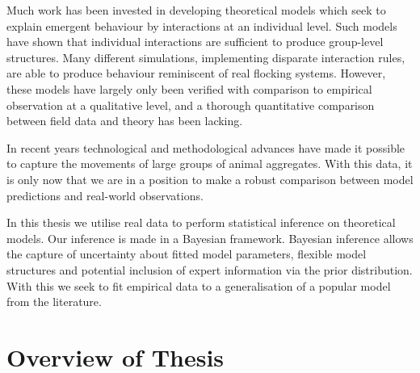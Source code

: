 Much work has been invested in developing theoretical models which seek to explain emergent behaviour by interactions at an individual level. Such models have shown that individual interactions are sufficient to produce group-level structures. Many different simulations, implementing disparate interaction rules, are able to produce behaviour reminiscent of real flocking systems. However, these models have largely only been verified with comparison to empirical observation at a qualitative level, and a thorough quantitative comparison between field data and theory has been lacking.

In recent years technological and methodological advances have made it possible to capture the movements of large groups of animal aggregates. With this data, it is only now that we are in a position to make a robust comparison between model predictions and real-world observations.

In this thesis we utilise real data to perform statistical inference on theoretical models. Our inference is made in a Bayesian framework. Bayesian inference allows the capture of uncertainty about fitted model parameters, flexible model structures and potential inclusion of expert information via the prior distribution. With this we seek to fit empirical data to a generalisation of a popular model from the literature.

\section{Overview of Thesis}

